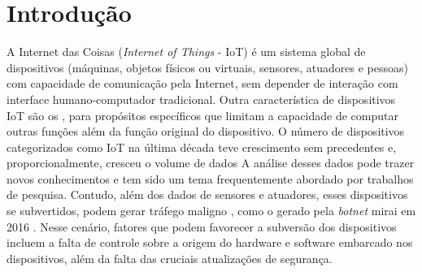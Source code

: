 \chapter{Introdução}\label{cha:intro}

\newcommand{\iot}{IoT\xspace}

A Internet das Coisas (\emph{Internet of Things} - IoT) é um sistema global de
dispositivos (máquinas, objetos físicos ou virtuais, sensores, atuadores e
pessoas) com capacidade de comunicação pela Internet, sem depender de
interação com interface humano-computador tradicional.
Outra característica de dispositivos \iot são os 
,
para
propósitos específicos que limitam a capacidade de computar outras funções além
da função original do dispositivo.
O número de dispositivos categorizados como IoT na última década teve
crescimento sem precedentes e, proporcionalmente, cresceu o volume de dados
A análise desses dados pode trazer novos conhecimentos e tem sido um tema frequentemente
abordado por trabalhos de pesquisa.
Contudo, além dos dados de sensores e atuadores, esses dispositivos se subvertidos,
podem gerar tráfego maligno
, como o gerado pela
\emph{botnet} mirai em 2016 \cite{Kambourakis2017}.
Nesse cenário, fatores que podem favorecer a subversão dos dispositivos incluem a
falta de controle sobre a origem do hardware e software embarcado nos
dispositivos, além da falta das cruciais atualizações de segurança.


\newcommand{\ds}{DS\xspace}

